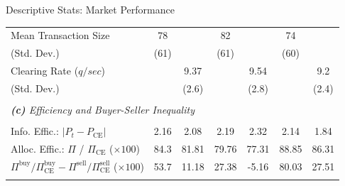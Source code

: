 \documentclass[10pt]{beamer}
\begin{document}
\begin{frame}{Descriptive Stats: Market Performance}
\begin{table}
{\begin{threeparttable}
\begin{tabular}{lcccccc}
     Mean Transaction Size                      & 78        &           & 82        &           & 74        &           \\
     \hspace{3mm}(Std. Dev.)             & (61)      &           & (61)      &           & (60)      &           \\
     Clearing Rate ($q/sec$)                 &           & 9.37      &           & 9.54      &           & 9.2       \\
     \hspace{3mm}(Std. Dev.)             &           & (2.6)     &           & (2.8)     &           & (2.4)     \\
     \\ [-1.8ex]
     \multicolumn{7}{l}{\textit{\textbf{(c)} Efficiency and Buyer-Seller Inequality}} \\
     \\ [-1.8ex]
     Info. Effic.: $\lvert P_t - P_{\text{CE}} \rvert $        & 2.16      & 2.08      & 2.19      & 2.32      & 2.14      & 1.84      \\     
     Alloc. Effic.: $\Pi$ / $\Pi_{\text{CE}}$ ($\times 100$)          & 84.3      & 81.81     & 79.76     & 77.31     & 88.85     & 86.31     \\
     
     ${\Pi^{\text{buy}}}/{\Pi^{\text{buy}}_{\text{CE}}} - {\Pi^{\text{sell}}}/{\Pi^{\text{sell}}_{\text{CE}}}$ 
     ($\times 100$) & 53.7      & 11.18     & 27.38     & -5.16     & 80.03     & 27.51     \\
     \\[-1.8ex] 
    \bottomrule 
    \end{tabular}
    \begin{tablenotes}
      \footnotesize
    \end{tablenotes}
    \end{threeparttable}
   }
    \label{tab:summary_stat}
\end{table}
\end{frame}
\end{document}
